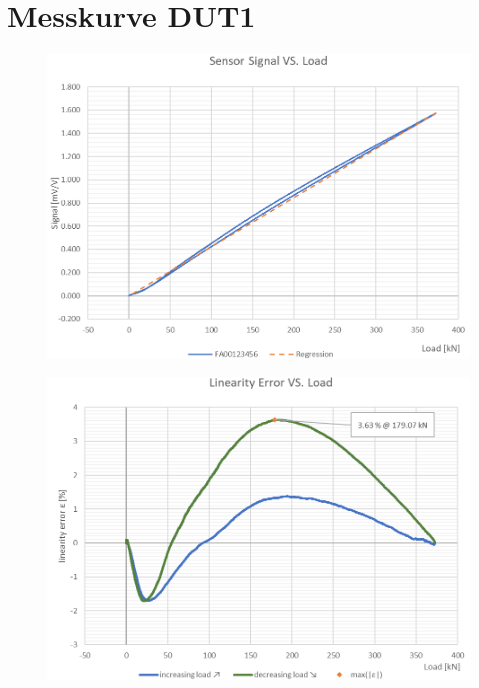 \documentclass[12pt,a4paper]{article}
\begin{document}
	\section{Messkurve DUT1}
	\begin{figure}[H]
		\centering
		\includegraphics[width=.8\linewidth]{img/screenshot001}
		\label{fig:screenshot001}
	\end{figure}
	\begin{figure}[H]
		\centering
		\includegraphics[width=.8\linewidth]{img/screenshot002}
		\label{fig:screenshot002}
	\end{figure}
\end{document}
